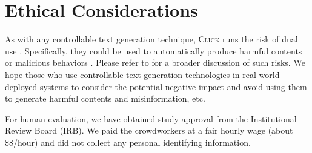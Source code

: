 \section*{Ethical Considerations}

As with any controllable text generation technique, \textsc{Click} runs the risk of dual use \cite{pandya2019dual}. Specifically, they could be used to automatically produce harmful contents or malicious behaviors \cite{mcguffie2020radicalization}. Please refer to \cite{bender2021dangers} for a broader discussion of such risks. We hope those who use controllable text generation technologies in real-world deployed systems to consider the potential negative impact and avoid using them to generate harmful contents and misinformation, etc.

For human evaluation, we have obtained study approval from the Institutional Review Board (IRB). We paid the crowdworkers at a fair hourly wage (about \$8/hour) and did not collect any personal identifying information.


